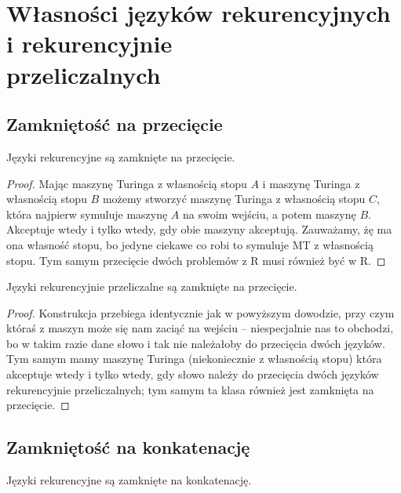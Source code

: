 \section{Własności języków rekurencyjnych i rekurencyjnie\texorpdfstring{\\}{}przeliczalnych}

\subsection{Zamkniętość na przecięcie}

\begin{theorem}
    Języki rekurencyjne są zamknięte na przecięcie.
\end{theorem}

\begin{proof}
    Mając maszynę Turinga z własnością stopu \(A\) i maszynę Turinga z własnością stopu \(B\) możemy stworzyć maszynę Turinga z własnością stopu \(C\), która najpierw symuluje maszynę \(A\) na swoim wejściu, a potem maszynę \(B\). Akceptuje wtedy i tylko wtedy, gdy obie maszyny akceptują. Zauważamy, żę ma ona własność stopu, bo jedyne ciekawe co robi to symuluje MT z własnością stopu. Tym samym przecięcie dwóch problemów z R musi również być w R.
\end{proof}

\begin{theorem}
    Języki rekurencyjnie przeliczalne są zamknięte na przecięcie.
\end{theorem}
\begin{proof}
    Konstrukcja przebiega identycznie jak w powyższym dowodzie, przy czym któraś z maszyn może się nam zaciąć na wejściu -- niespecjalnie nas to obchodzi, bo w takim razie dane słowo i tak nie należałoby do przecięcia dwóch języków. Tym samym mamy maszynę Turinga (niekoniecznie z własnością stopu) która akceptuje wtedy i tylko wtedy, gdy słowo należy do przecięcia dwóch języków rekurencyjnie przeliczalnych; tym samym ta klasa również jest zamknięta na przecięcie.  
\end{proof}

\subsection{Zamkniętość na konkatenację}

\begin{theorem}
    Języki rekurencyjne są zamknięte na konkatenację.
\end{theorem}

